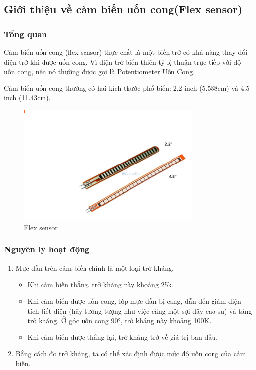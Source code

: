 \subsection{Giới thiệu về cảm biến uốn cong(Flex sensor)}


\subsubsection{Tổng quan} 

\indent Cảm biến uốn cong (flex sensor) thực chất là một biến trở có khả năng thay đổi điện trở khi được uốn cong. Vì điện trở biến thiên tỷ lệ thuận trực tiếp với độ uốn cong, nên nó thường được gọi là Potentiometer Uốn Cong.

\indent Cảm biến uốn cong thường có hai kích thước phổ biến: 2.2 inch (5.588cm) và 4.5 inch (11.43cm).

\begin{figure}[H]
    \centering
    \includegraphics[width=9cm]{Images/Theoretical basis/flex sensor.png}
\caption{Flex sensor}
\end{figure}

\subsubsection{Nguyên lý hoạt động}

\begin{enumerate}[-]
    \item Mực dẫn trên cảm biến chính là một loại trở kháng. 
    \begin{itemize}
        \item Khi cảm biến thẳng, trở kháng này khoảng 25k.
        \item Khi cảm biến được uốn cong, lớp mực dẫn bị căng, dẫn đến giảm diện tích tiết diện (hãy tưởng tượng như việc căng một sợi dây cao su) và tăng trở kháng. Ở góc uốn cong 90°, trở kháng này khoảng 100K.
        \item Khi cảm biến được thẳng lại, trở kháng trở về giá trị ban đầu.
    \end{itemize}
    \item  Bằng cách đo trở kháng, ta có thể xác định được mức độ uốn cong của cảm biến.
\end{enumerate}

